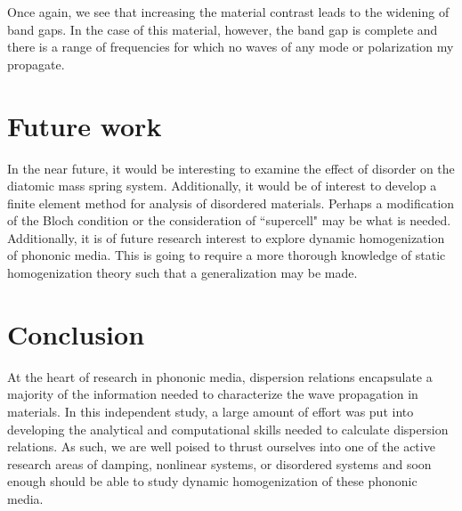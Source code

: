 \documentclass{article}
\begin{document}
Once again, we see that increasing the material contrast leads to the widening 
of band gaps. In the case of this material, however, the band gap is complete 
and there is a range of frequencies for which no waves of any mode or 
polarization my propagate.
\section{Future work}
In the near future, it would be interesting to examine the effect of disorder 
on the diatomic mass spring system. Additionally, it would be of interest to 
develop a finite element method for analysis of disordered materials. Perhaps a 
modification of the Bloch condition or the consideration of ``supercell" may be 
what is needed. Additionally, it is of future research interest to explore 
dynamic homogenization of phononic media. This is going to require a more 
thorough knowledge of static homogenization theory such that a generalization 
may be made.

\section{Conclusion}
At the heart of research in phononic media, dispersion relations encapsulate a 
majority of the information needed to characterize the wave propagation in 
materials. In this independent study, a large amount of effort was put into 
developing the analytical and computational skills needed to calculate 
dispersion relations. As such, we are well poised to thrust ourselves into one 
of the active research areas of damping, nonlinear systems, or disordered 
systems and soon enough should be able to study dynamic homogenization of these 
phononic media. 
\end{document}
